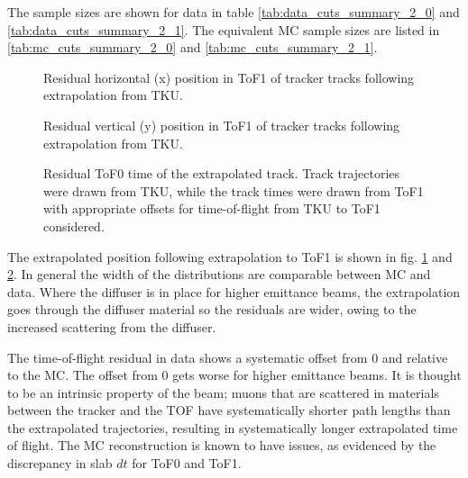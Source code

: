 The sample sizes are shown for data in table \ref{tab:data_cuts_summary_2_0} and
\ref{tab:data_cuts_summary_2_1}. The equivalent MC sample sizes are listed in 
\ref{tab:mc_cuts_summary_2_0} and \ref{tab:mc_cuts_summary_2_1}.

\let\splitcell\undefined

\let\splitcell\undefined

\let\splitcell\undefined

\begin{figure}[!tbh]
    \centering
    {Residual horizontal (x) position in ToF1 of tracker tracks following extrapolation from TKU. \label{fig:tof1_extrapolated_x}}
\end{figure}

\begin{figure}[!tbh]
    \centering
    {Residual vertical (y) position in ToF1 of tracker tracks following extrapolation from TKU. \label{fig:tof1_extrapolated_y}}
\end{figure}

\begin{figure}[!tbh]
    \centering
    {Residual ToF0 time of the extrapolated track. Track trajectories were drawn from TKU, while the track times were
    drawn from ToF1 with appropriate offsets for time-of-flight from TKU to ToF1 considered. \label{fig:tof0_extrapolated_t}}
\end{figure}

The extrapolated position following extrapolation to ToF1 is shown in fig.
\ref{fig:tof1_extrapolated_x} and \ref{fig:tof1_extrapolated_y}. In general the width 
of the distributions are comparable between MC and data. Where the diffuser is in
place for higher emittance beams, the extrapolation goes through the diffuser
material so the residuals are wider, owing to the increased scattering from the
diffuser.

The time-of-flight residual in data shows a systematic offset from 0 and relative to the
MC. The offset from 0 gets worse for higher emittance beams. It is thought to be
an intrinsic property of the beam; muons that are scattered in materials between 
the tracker and the TOF have systematically shorter path lengths than the 
extrapolated trajectories, resulting in systematically longer extrapolated time
of flight. The MC reconstruction is known to have issues, as evidenced by the 
discrepancy in slab $dt$ for ToF0 and ToF1.

